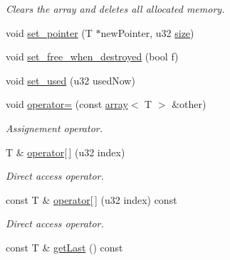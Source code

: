 \begin{DoxyCompactItemize}
\begin{DoxyCompactList}\small\item\em Clears the array and deletes all allocated memory. \end{DoxyCompactList}\item 
void \hyperlink{classirr_1_1core_1_1array_ad0efa8d2ea5078580e5cea1848992a88}{set\+\_\+pointer} (T $\ast$new\+Pointer, u32 \hyperlink{classirr_1_1core_1_1array_ad63ccc83da39943532c7af164c7b7bcf}{size})
\item 
void \hyperlink{classirr_1_1core_1_1array_a0b66cac31609933337fb81bb4a518c8c}{set\+\_\+free\+\_\+when\+\_\+destroyed} (bool f)
\item 
void \hyperlink{classirr_1_1core_1_1array_a0767f2095c59d44a73abf4a9fa9480ba}{set\+\_\+used} (u32 used\+Now)
\item 
\hypertarget{classirr_1_1core_1_1array_aa0f0ea56d18bb90eb5c8f286c7273a88}{void \hyperlink{classirr_1_1core_1_1array_aa0f0ea56d18bb90eb5c8f286c7273a88}{operator=} (const \hyperlink{classirr_1_1core_1_1array}{array}$<$ T $>$ \&other)}\label{classirr_1_1core_1_1array_aa0f0ea56d18bb90eb5c8f286c7273a88}

\begin{DoxyCompactList}\small\item\em Assignement operator. \end{DoxyCompactList}\item 
\hypertarget{classirr_1_1core_1_1array_a67098e889f4e1f72e442f17dd50cff5f}{T \& \hyperlink{classirr_1_1core_1_1array_a67098e889f4e1f72e442f17dd50cff5f}{operator\mbox{[}$\,$\mbox{]}} (u32 index)}\label{classirr_1_1core_1_1array_a67098e889f4e1f72e442f17dd50cff5f}

\begin{DoxyCompactList}\small\item\em Direct access operator. \end{DoxyCompactList}\item 
\hypertarget{classirr_1_1core_1_1array_adb02c1c24954863613a6f2ab0f316bf2}{const T \& \hyperlink{classirr_1_1core_1_1array_adb02c1c24954863613a6f2ab0f316bf2}{operator\mbox{[}$\,$\mbox{]}} (u32 index) const }\label{classirr_1_1core_1_1array_adb02c1c24954863613a6f2ab0f316bf2}

\begin{DoxyCompactList}\small\item\em Direct access operator. \end{DoxyCompactList}\item 
\hypertarget{classirr_1_1core_1_1array_a5424fdabc6ad12f503a15b2c4d7f6b0e}{const T \& \hyperlink{classirr_1_1core_1_1array_a5424fdabc6ad12f503a15b2c4d7f6b0e}{get\+Last} () const }\label{classirr_1_1core_1_1array_a5424fdabc6ad12f503a15b2c4d7f6b0e}


\end{DoxyCompactItemize}
